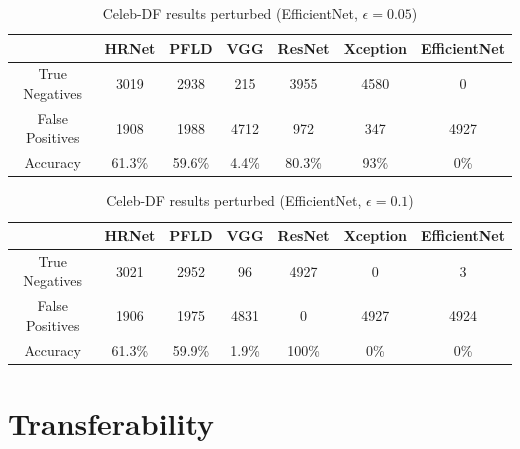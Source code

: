 \begin{table}[H]
    \centering
    \begin{tabular}{|c|c|c|c|c|c|c|}
        \hline
        \textbf{} & \textbf{HRNet} & \textbf{PFLD} &  \textbf{VGG} & \textbf{ResNet} & \textbf{Xception} & \textbf{EfficientNet} \\
        \hline
        True Negatives & 3019 & 2938 & 215 & 3955 & 4580 & 0\\
        \hline
        False Positives & 1908 & 1988 & 4712 & 972 & 347 & 4927\\
        \hline
        Accuracy & 61.3\% & 59.6\% & 4.4\% & 80.3\% & 93\% & 0\% \\
        \hline
    \end{tabular}
    \caption{Celeb-DF results perturbed (EfficientNet, $\epsilon=0.05$)}
    \label{tab:cd-eff-5}
\end{table}

\begin{table}[H]
    \centering
    \begin{tabular}{|c|c|c|c|c|c|c|}
        \hline
        \textbf{} & \textbf{HRNet} & \textbf{PFLD} &  \textbf{VGG} & \textbf{ResNet} & \textbf{Xception} & \textbf{EfficientNet} \\
        \hline
        True Negatives & 3021 & 2952 & 96 & 4927 & 0 & 3\\
        \hline
        False Positives & 1906 & 1975 & 4831 & 0 & 4927 & 4924\\
        \hline
        Accuracy & 61.3\% & 59.9\% & 1.9\% & 100\% & 0\% & 0\% \\
        \hline
    \end{tabular}
    \caption{Celeb-DF results perturbed (EfficientNet, $\epsilon=0.1$)}
    \label{tab:cd-eff-1}
\end{table}

\section{Transferability}
\label{sec:transfer}

